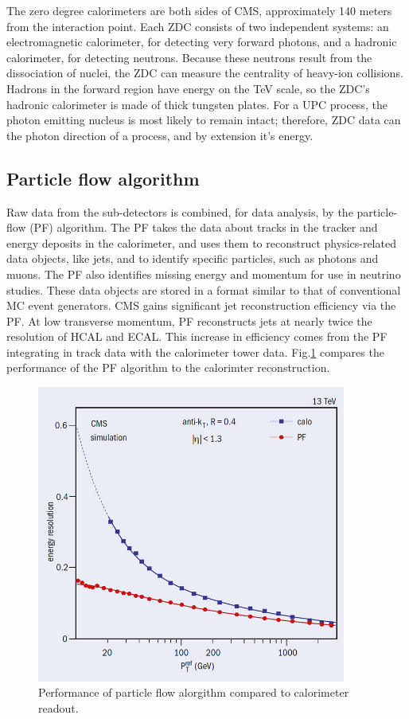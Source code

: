 The zero degree calorimeters are both sides of CMS, approximately 140 meters from the interaction point. Each ZDC consists of two independent systems: an electromagnetic calorimeter, for detecting very forward photons, and a hadronic calorimeter, for detecting neutrons. Because these neutrons result from the dissociation of nuclei, the ZDC can measure the centrality of heavy-ion collisions. Hadrons in the forward region have energy on the TeV scale, so the ZDC's hadronic calorimeter is made of thick tungsten plates. For a UPC process, the photon emitting nucleus is most likely to remain intact; therefore, ZDC data can the photon direction of a process, and by extension it's energy. 

\subsection{Particle flow algorithm}

Raw data from the sub-detectors is combined, for data analysis, by the particle-flow (PF) algorithm. The PF takes the data about tracks in the tracker and energy deposits in the calorimeter, and uses them to reconstruct physics-related data objects, like jets, and to identify specific particles, such as photons and muons. The PF also identifies missing energy and momentum for use in neutrino studies. These data objects are stored in a format similar to that of conventional MC event generators. CMS gains significant jet reconstruction efficiency via the PF. At low transverse momentum, PF reconstructs jets at nearly twice the resolution of HCAL and ECAL. This increase in efficiency comes from the PF integrating in track data with the calorimeter tower data. Fig.\ref{fig:pfPerf} compares the performance of the PF algorithm to the calorimter reconstruction.

\begin{figure}[h!]
\begin{centering}
\includegraphics[width=4in]{Chapter3/importfigs/CCrec2_05_16.jpg}
\par\end{centering}
\caption{Performance of particle flow alorgithm compared to calorimeter readout.\label{fig:pfPerf}}
\end{figure}


